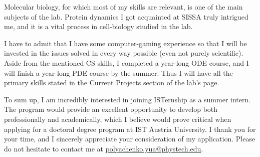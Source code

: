 \documentclass[12pt, a4paper]{awesome-cv}
\begin{document}
\begin{cvletter}
Molecular biology, for which most of my skills are relevant, is one of the main subjects of the lab. Protein dynamics I got acquainted at SISSA truly intrigued me, and it is a vital process in cell-biology studied in the lab.

I have to admit that I have some computer-gaming experience so that I will be invested in the issues solved in every way possible (even not purely scientific). Aside from the mentioned CS skills, I completed a year-long ODE course, and I will finish a year-long PDE course by the summer. Thus I will have all the primary skills stated in the Current Projects section of the lab’s page.

\end{cvletter}

To sum up, I am incredibly interested in joining ISTernship as a summer intern. The program would provide an excellent opportunity to develop both professionally and academically, which I believe would prove critical when applying for a doctoral degree program at IST Austria University. I thank you for your time, and I sincerely appreciate your consideration of my application. Please do not hesitate to contact me at \href{mailto:polyachenko.yua@phystech.edu}{polyachenko.yua@phystech.edu}.

\makeletterclosing
\end{document}
